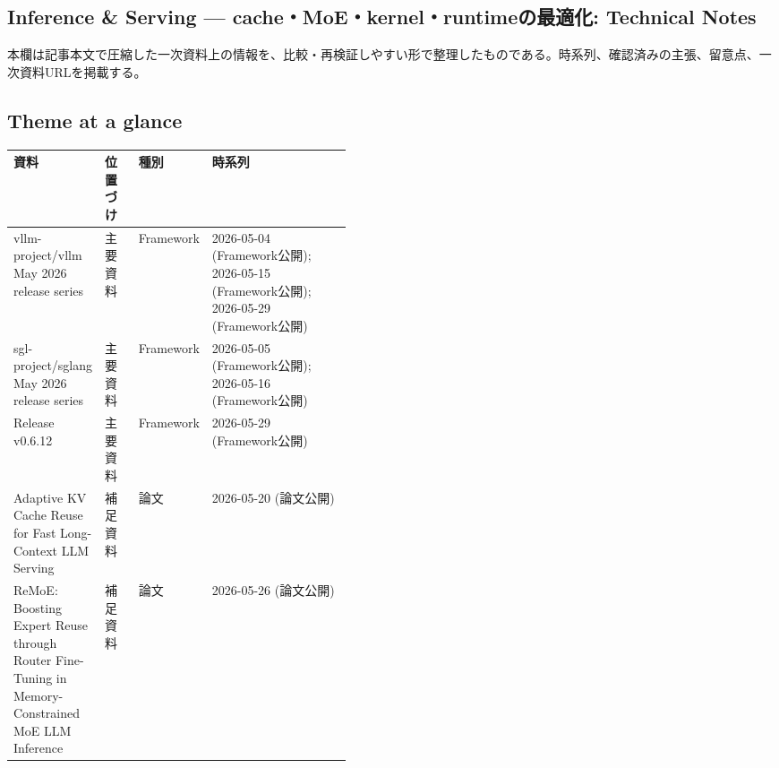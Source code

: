 \subsection*{Inference \& Serving — cache・MoE・kernel・runtimeの最適化: Technical Notes}
本欄は記事本文で圧縮した一次資料上の情報を、比較・再検証しやすい形で整理したものである。時系列、確認済みの主張、留意点、一次資料URLを掲載する。
\medskip
\subsection*{Theme at a glance}
\begin{center}
\footnotesize
\begin{tabularx}{\linewidth}{@{}p{0.20\linewidth}p{0.10\linewidth}p{0.14\linewidth}X@{}}
\toprule
資料 & 位置づけ & 種別 & 時系列 \\
\midrule
vllm-project/vllm May 2026 release series & 主要資料 & Framework & 2026-05-04 (Framework公開); 2026-05-15 (Framework公開); 2026-05-29 (Framework公開) \\
sgl-project/sglang May 2026 release series & 主要資料 & Framework & 2026-05-05 (Framework公開); 2026-05-16 (Framework公開) \\
Release v0.6.12 & 主要資料 & Framework & 2026-05-29 (Framework公開) \\
Adaptive KV Cache Reuse for Fast Long-Context LLM Serving & 補足資料 & 論文 & 2026-05-20 (論文公開) \\
ReMoE: Boosting Expert Reuse through Router Fine-Tuning in Memory-Constrained MoE LLM Inference & 補足資料 & 論文 & 2026-05-26 (論文公開) \\
\bottomrule
\end{tabularx}
\end{center}
\normalsize

